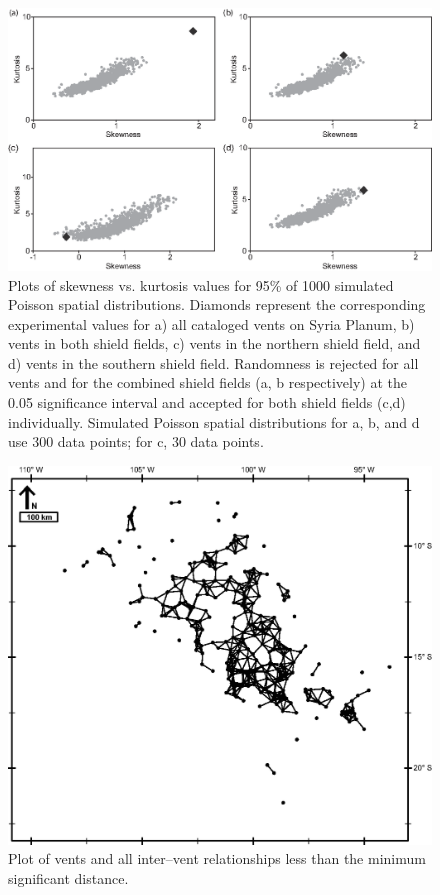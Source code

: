 \begin{figure}
\noindent\includegraphics{figures/fig4.eps}
\caption{Plots of skewness vs. kurtosis values for 95\% of 1000 simulated Poisson spatial distributions. Diamonds represent the corresponding experimental values for a) all cataloged vents on Syria Planum, b) vents in both shield fields, c) vents in the northern shield field, and d) vents in the southern shield field. Randomness is rejected for all vents and for the combined shield fields (a, b respectively) at the 0.05 significance interval and accepted for both shield fields (c,d) individually. Simulated Poisson spatial distributions for a, b, and d use 300 data points; for c, 30 data points.}
\label{fig-skgraphs}
\end{figure}

\begin{figure}
\noindent\includegraphics{figures/fig5.eps}
\caption{Plot of vents and all inter--vent relationships less than the minimum significant distance.}
\label{fig-azmap}
\end{figure}

